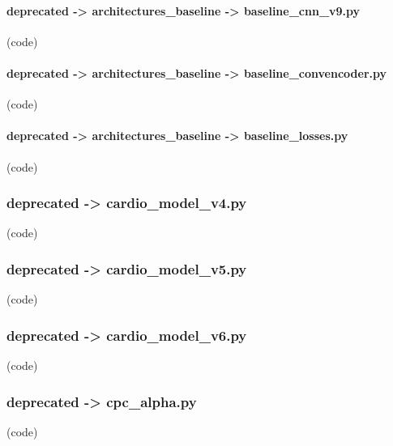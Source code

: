 \begin{myparindent}{0pt}
\noindent\paragraph[baseline\_cnn\_v9.py]{deprecated -> architectures\_baseline -> baseline\_cnn\_v9.py} (code)

\noindent\paragraph[baseline\_convencoder.py]{deprecated -> architectures\_baseline -> baseline\_convencoder.py} (code)

\noindent\paragraph[baseline\_losses.py]{deprecated -> architectures\_baseline -> baseline\_losses.py} (code)

\noindent\subsubsection[cardio\_model\_v4.py]{deprecated -> cardio\_model\_v4.py} (code)

\noindent\subsubsection[cardio\_model\_v5.py]{deprecated -> cardio\_model\_v5.py} (code)

\noindent\subsubsection[cardio\_model\_v6.py]{deprecated -> cardio\_model\_v6.py} (code)

\noindent\subsubsection[cpc\_alpha.py]{deprecated -> cpc\_alpha.py} (code)

\end{myparindent}
